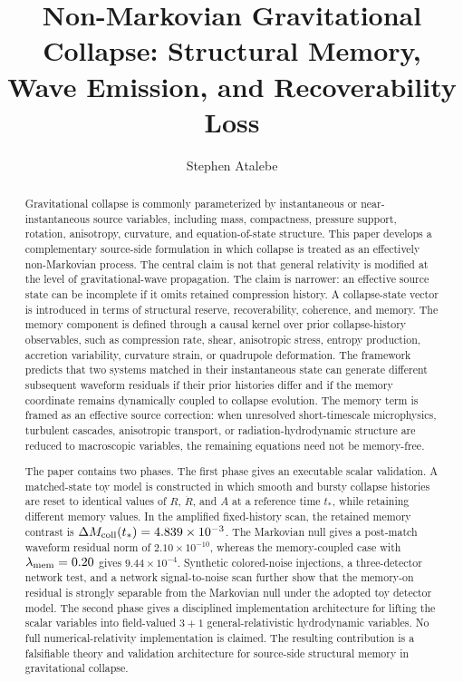 \documentclass[11pt]{article}
\title{Non-Markovian Gravitational Collapse: Structural Memory, Wave Emission, and Recoverability Loss}
\author{Stephen Atalebe}
\date{}
\begin{document}
\maketitle

\begin{abstract}
Gravitational collapse is commonly parameterized by instantaneous or near-instantaneous source variables, including mass, compactness, pressure support, rotation, anisotropy, curvature, and equation-of-state structure. This paper develops a complementary source-side formulation in which collapse is treated as an effectively non-Markovian process. The central claim is not that general relativity is modified at the level of gravitational-wave propagation. The claim is narrower: an effective source state can be incomplete if it omits retained compression history. A collapse-state vector is introduced in terms of structural reserve, recoverability, coherence, and memory. The memory component is defined through a causal kernel over prior collapse-history observables, such as compression rate, shear, anisotropic stress, entropy production, accretion variability, curvature strain, or quadrupole deformation. The framework predicts that two systems matched in their instantaneous state can generate different subsequent waveform residuals if their prior histories differ and if the memory coordinate remains dynamically coupled to collapse evolution. The memory term is framed as an effective source correction: when unresolved short-timescale microphysics, turbulent cascades, anisotropic transport, or radiation-hydrodynamic structure are reduced to macroscopic variables, the remaining equations need not be memory-free.

The paper contains two phases. The first phase gives an executable scalar validation. A matched-state toy model is constructed in which smooth and bursty collapse histories are reset to identical values of \(R\), \(\dot R\), and \(A\) at a reference time \(t_\ast\), while retaining different memory values. In the amplified fixed-history scan, the retained memory contrast is \(\Delta M_{\rm coll}(t_\ast)=4.839\times10^{-3}\). The Markovian null gives a post-match waveform residual norm of \(2.10\times10^{-10}\), whereas the memory-coupled case with \(\lambda_{\rm mem}=0.20\) gives \(9.44\times10^{-4}\). Synthetic colored-noise injections, a three-detector network test, and a network signal-to-noise scan further show that the memory-on residual is strongly separable from the Markovian null under the adopted toy detector model. The second phase gives a disciplined implementation architecture for lifting the scalar variables into field-valued \(3+1\) general-relativistic hydrodynamic variables. No full numerical-relativity implementation is claimed. The resulting contribution is a falsifiable theory and validation architecture for source-side structural memory in gravitational collapse.
\end{abstract}
\end{document}
